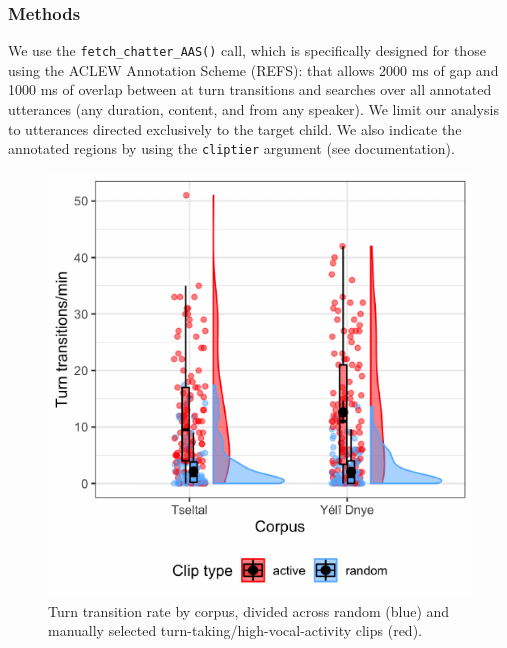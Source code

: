 \documentclass[10pt, letterpaper]{article}
\newenvironment{CodeChunk}{}{}
\begin{document}
\hypertarget{methods}{%
\subsubsection{Methods}\label{methods}}

We use the \texttt{fetch\_chatter\_AAS()} call, which is specifically
designed for those using the ACLEW Annotation Scheme (REFS): that allows
2000 ms of gap and 1000 ms of overlap between at turn transitions and
searches over all annotated utterances (any duration, content, and from
any speaker). We limit our analysis to utterances directed exclusively
to the target child. We also indicate the annotated regions by using the
\texttt{cliptier} argument (see documentation).

\begin{CodeChunk}
\begin{figure}[h]

{\centering \includegraphics{figs/tseyel.ttr.fig-1} 

}

\caption[Turn transition rate by corpus, divided across random (blue) and manually selected turn-taking/high-vocal-activity clips (red)]{Turn transition rate by corpus, divided across random (blue) and manually selected turn-taking/high-vocal-activity clips (red).}\label{fig:tseyel.ttr.fig}
\end{figure}
\end{CodeChunk}
\end{document}
